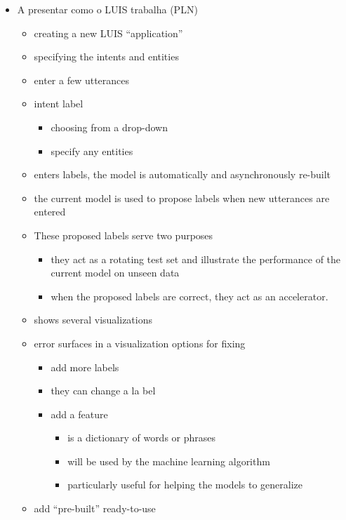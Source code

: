 
\begin{itemize}
	\item A presentar como o LUIS trabalha (PLN)

		\begin{itemize}
			\item creating a new LUIS “application”
			\item specifying the intents and entities
			\item enter a few utterances
			\item intent label
				\begin{itemize}
					\item choosing from a drop-down
					\item specify any entities
				\end{itemize}

			\item enters labels, the model is automatically and asynchronously re-built
			\item the current model is used to propose labels when new utterances are entered
			\item These proposed labels serve two purposes
				\begin{itemize}
					\item they act as a rotating test set and illustrate the performance of the current model on unseen data
					\item when the proposed labels are correct, they act as an accelerator.
				\end{itemize}
			\item shows several visualizations
			\item error surfaces in a visualization options for fixing
				\begin{itemize}
					\item add more labels
					\item they can change a la bel
					\item add a feature
						\begin{itemize}
							\item is a dictionary of words or phrases
							\item will be used by the machine learning algorithm
							\item particularly useful for helping the models to generalize
						\end{itemize}
				\end{itemize}
			\item add “pre-built” ready-to-use
				\begin{itemize}

\end{itemize}
\end{itemize}
\end{itemize}
